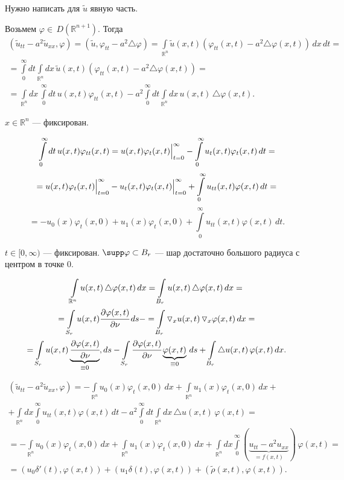 \documentclass[12pt,a4paper,draft]{article}
\DeclareRobustCommand*{\т}{~--- }
\DeclareRobustCommand*{\ч}{~-- }
\begin{document}
Нужно написать для $\tilde u$ явную часть.

Возьмем $\varphi\in\,D(\mathbb R^{n+1}).$ Тогда
\begin{multline}
(\tilde u_{tt}-a^2\tilde u_{xx},\varphi)=(\tilde
u,\varphi_{tt}-a^2\triangle\varphi)= \int\limits_{\mathbb
R^n}\tilde
u(x,t)(\varphi_{tt}(x,t)-a^2\triangle\varphi(x,t))\,dx\,dt=\\=
\int\limits_0^{\infty}dt \int\limits_{\mathbb R^n}dx\,\tilde
u(x,t)(\varphi_{tt}(x,t)-a^2\triangle\varphi(x,t))=\\=
\int\limits_{\mathbb
R^n}dx\,\int\limits_0^{\infty}dt\,u(x,t)\varphi_{tt}(x,t)-
a^2\int\limits_0^{\infty}dt \int\limits_{\mathbb
R^n}dx\,u(x,t)\,\triangle\varphi(x,t).
\end{multline}

$x\in \mathbb R^n$ --- фиксирован.

$$\int\limits_0^{\infty}dt\,u(x,t)\varphi_{tt}(x,t)=
\Bigl.u(x,t)\varphi_{t}(x,t)\Bigr|_{t=0}^{\infty}-
\int\limits_0^{\infty}u_t(x,t)\varphi_{t}(x,t)\,dt=$$
$$=\Bigl.u(x,t)\varphi_{t}(x,t)\Bigr|_{t=0}^{\infty}-
\Bigl.u_t(x,t)\varphi_{t}(x,t)\Bigr|_{t=0}^{\infty}+
\int\limits_0^{\infty}u_{tt}(x,t)\varphi(x,t)\,dt=$$
$$=-u_0(x)\varphi_{t}(x,0)+u_1(x)\varphi_{t}(x,0)+
\int\limits_0^{\infty}u_{tt}(x,t)\varphi(x,t)\,dt.$$

$t\in [0,\infty)$ --- фиксирован. $\supp \varphi\subset B_r$  ---
шар достаточно большого радиуса с центром в точке 0.

\begin{multline}
\int\limits_{\mathbb R^n}u(x,t)\,\triangle\varphi(x,t)\,dx=
\int\limits_{B_r}u(x,t)\,\triangle\varphi(x,t)\,dx=\\=
\int\limits_{S_r}u(x,t)\cfrac{\partial \varphi(x,t)}{\partial
\nu}\,ds-=\int\limits_{B_r}\triangledown_x
u(x,t)\,\triangledown_x\varphi(x,t)\,dx=\\=
\int\limits_{S_r}u(x,t)\underbrace{\cfrac{\partial \varphi(x,t)}{\partial
\nu}}_{\equiv0},ds- \int\limits_{S_r}\cfrac{\partial
\varphi(x,t)}{\partial
\nu}\underbrace{\varphi(x,t)}_{\equiv0}\,ds+\int\limits_{B_r}\triangle
u(x,t)\,\varphi(x,t)\,dx.
\end{multline}

\begin{multline}
(\tilde u_{tt}-a^2\tilde u_{xx},\varphi)=
-\int\limits_{\mathbb
R^n}u_0(x)\varphi_t(x,0)\,dx+\int\limits_{\mathbb
R^n}u_1(x)\varphi_t(x,0)\,dx+\\+
\int\limits_{\mathbb R^n}dx
\int\limits_0^{\infty}u_{tt}(x,t)\varphi(x,t)\,dt-
a^2\int\limits_0^{\infty}dt \int\limits_{\mathbb R^n}dx\,\triangle
u(x,t)\,\varphi(x,t)=\\=
-\int\limits_{\mathbb
R^n}u_0(x)\varphi_t(x,0)\,dx+\int\limits_{\mathbb
R^n}u_1(x)\varphi_t(x,0)\,dx+\int\limits_{\mathbb R^n}dx
\int\limits_0^{\infty}(\underbrace{u_{tt}-a^2u_{xx}}_{=f(x,t)})\,\varphi(x,t)=\\=
(u_0\delta'(t),\varphi(x,t))+(u_1\delta(t),\varphi(x,t))+
(\tilde\rho(x,t),\varphi(x,t)).
\end{multline}
\end{document}
